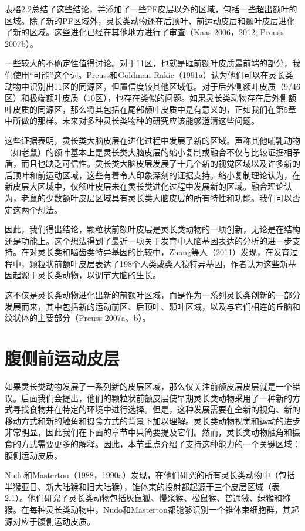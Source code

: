 表格2.2总结了这些结论，并添加了一些PF皮层以外的区域，包括一些超出额叶的区域。除了新的PF区域外，灵长类动物还在后顶叶、前运动皮层和颞叶皮层进化了新的区域。这些进化已经在其他地方进行了审查（Kaas 2006，2012; Preuss 2007b）。


一些较大的不确定性值得讨论。对于11区，也就是眶前额叶皮质最前端的部分，我们使用“可能”这个词。Preuss和Goldman-Rakic（1991a）认为他们可以在灵长类动物中识别出11区的同源区，但置信度较其他区域低。对于后外侧额叶皮质（9/46区）和极端额叶皮质（10区），也存在类似的问题。如果灵长类动物存在后外侧额叶皮质的同源区，那么将其包括在尾部额叶皮质中是有意义的，正如我们在第5章中所做的那样。未来对多种灵长类物种的研究应该能够澄清这些问题。

这些证据表明，灵长类大脑皮层在进化过程中发展了新的区域。声称其他哺乳动物（如老鼠）的额叶基本上是灵长类大脑皮层的缩小复制或融合不仅与比较证据相矛盾，而且也缺乏可信性。灵长类大脑皮层发展了十几个新的视觉区域以及许多新的后顶叶和前运动区域，这些有着令人印象深刻的证据支持。缩小复制理论认为，在新皮层大区域中，仅额叶皮层未在灵长类进化过程中发展新的区域。融合理论认为，老鼠的少数额叶皮层区域具有灵长类大脑皮层的所有特性和功能。我们可以否定这两个想法。

因此，我们得出结论，颗粒状前额叶皮层是灵长类动物的一项创新，无论是在结构还是功能上。这个想法得到了最近一项关于发育中人脑基因表达的分析的进一步支持。在对灵长类和啮齿类特异基因的比较中，Zhang等人（2011）发现，在发育过程中，颗粒状前额叶皮层表达了198个人类或类人猿特异基因，作者认为这些新基因起源于灵长类动物，以调节大脑的生长。

这不仅是灵长类动物进化出新的前额叶区域，而是作为一系列灵长类创新的一部分发展而来，其中包括新的运动前区、后顶叶、颞叶区域，以及与它们相连的丘脑和纹状体的主要部分（Preuss 2007a、b）。

\section{腹侧前运动皮层}
如果灵长类动物发展了一系列新的皮层区域，那么仅关注前额皮层皮层就是一个错误。后面我们会提出，他们的颗粒状前额皮层使早期灵长类动物采用了一种新的方式寻找食物并在特定的环境中进行选择。但是，这种发展需要在全新的视角、新的移动方式和新的触角和摄食方式的背景下加以理解。灵长类动物视觉和运动的进步非常明显，因此我们在下面的章节中只简要提及它们。然而，灵长类动物触角和摄食的方式需要更多的解释。因此，本节重点介绍了支持这种能力的一个关键区域：腹侧运动皮质。

Nudo和Masterton（1988，1990a）发现，在他们研究的所有灵长类动物中（包括半猴亚目、新大陆猴和旧大陆猴），锥体束的投射都起源于三个皮层区域（表2.1）。他们研究了灵长类动物包括灰鼠狐、慢浆猴、松鼠猴、普通狨、绿猴和猕猴。在每种灵长类动物中，Nudo和Masterton都能够识别一个锥体束细胞群，其起源对应于腹侧运动皮质。

